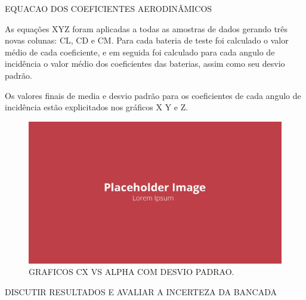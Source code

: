EQUACAO DOS COEFICIENTES AERODINÂMICOS

As equações XYZ foram aplicadas a todas as amostras de dados gerando três novas colunas: CL, CD e CM. Para cada bateria de teste foi calculado o valor médio de cada coeficiente, e em seguida foi calculado para cada angulo de incidência o valor médio dos coeficientes das baterias, assim como seu desvio padrão.

Os valores finais de media e desvio padrão para os coeficientes de cada angulo de incidência estão explicitados nos gráficos X Y e Z.

\begin{figure}[!ht]
    \centering
    \includegraphics[width=.8\linewidth]{figuras/placeholder.png}
    \caption{GRAFICOS CX VS ALPHA COM DESVIO PADRAO\cite{autor}.}
    \label{fig:placeholder}
\end{figure}

DISCUTIR RESULTADOS E AVALIAR A INCERTEZA DA BANCADA

